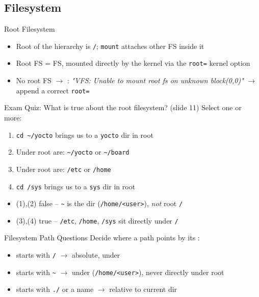\raggedcolumns
\columnbreak

\subsection{Filesystem}

\begin{concept}{Root Filesystem}
    \begin{itemize}
        \item Root of the hierarchy is \texttt{/}; \texttt{mount} attaches other FS inside it
        \item Root FS =  FS, mounted directly by the kernel
              via the \texttt{root=} kernel option
        \item No root FS $\to$ : \emph{"VFS: Unable to mount root
              fs on unknown block(0,0)"} $\to$ append a correct \texttt{root=}
    \end{itemize}
\end{concept}

\begin{example2}{Exam Quiz: What is true about the root filesystem? (slide 11)}
    Select one or more:
    \begin{enumerate}
        \item \texttt{cd \textasciitilde/yocto} brings us to a \texttt{yocto} dir in root
        \item Under root are: \texttt{\textasciitilde/yocto} or \texttt{\textasciitilde/board}
        \item Under root are: \texttt{/etc} or \texttt{/home}
        \item \texttt{cd /sys} brings us to a \texttt{sys} dir in root
    \end{enumerate}
    \tcblower
    \begin{itemize}
        \item (1),(2) false -- \texttt{\textasciitilde} is the  dir
              (\texttt{/home/<user>}), \emph{not} root \texttt{/}
        \item (3),(4) true -- \texttt{/etc}, \texttt{/home}, \texttt{/sys} sit directly
              under \texttt{/}
    \end{itemize}
\end{example2}

\begin{KR}{Filesystem Path Questions}
    Decide where a path points by its :
    \begin{itemize}
        \item starts with \texttt{/} $\to$ absolute, under 
        \item starts with \texttt{\textasciitilde} $\to$ under 
              (\texttt{/home/<user>}), never directly under root
        \item starts with \texttt{./} or a name $\to$ relative to current dir
    \end{itemize}
\end{KR}

